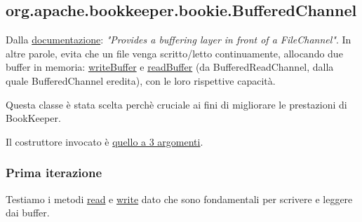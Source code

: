 \documentclass[10pt, a4paper]{article}
\def\bookkeeper{BookKeeper}
\begin{document}
	\subsection{org.apache.bookkeeper.bookie.BufferedChannel}
	Dalla 
	\href{https://bookkeeper.apache.org/docs/latest/api/javadoc/org/apache/bookkeeper/bookie/BufferedChannel.html}
	{documentazione}: \textit{"Provides a buffering layer in front of a FileChannel"}.
	In altre parole, evita che un file venga scritto/letto continuamente, allocando due buffer in memoria:
	\href{https://bookkeeper.apache.org/docs/latest/api/javadoc/org/apache/bookkeeper/bookie/BufferedChannel.html#writeBuffer}
	{writeBuffer} e 
	\href{https://bookkeeper.apache.org/docs/latest/api/javadoc/org/apache/bookkeeper/bookie/BufferedReadChannel.html#readBuffer}
	{readBuffer} (da BufferedReadChannel, dalla quale BufferedChannel eredita), con le loro rispettive capacità.
	
	Questa classe è stata scelta perchè cruciale ai fini di migliorare le prestazioni di \bookkeeper.
	
	Il costruttore invocato è \href{https://bookkeeper.apache.org/docs/latest/api/javadoc/org/apache/bookkeeper/bookie/BufferedChannel.html#\%3Cinit\%3E(io.netty.buffer.ByteBufAllocator,java.nio.channels.FileChannel,int)}
	{quello a 3 argomenti}.
	
	\subsubsection{Prima iterazione}
	Testiamo i metodi 
	\href{https://bookkeeper.apache.org/docs/latest/api/javadoc/org/apache/bookkeeper/bookie/BufferedChannel.html#read(io.netty.buffer.ByteBuf,long,int)}
	{read} e
	\href{https://bookkeeper.apache.org/docs/latest/api/javadoc/org/apache/bookkeeper/bookie/BufferedChannel.html#write(io.netty.buffer.ByteBuf)}
	{write}
	dato che sono fondamentali per scrivere e leggere dai buffer.
	
\end{document}
